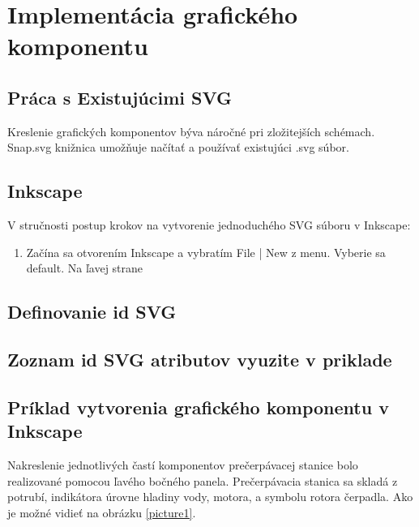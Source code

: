 \chapter{Implementácia grafického komponentu}

\section {Práca s Existujúcimi SVG}
Kreslenie grafických komponentov býva náročné pri zložitejších schémach. Snap.svg knižnica umožňuje načítať a používať existujúci .svg súbor.  


\section{Inkscape}

V stručnosti postup krokov na vytvorenie jednoduchého SVG súboru v Inkscape: 
\begin{enumerate}
	\item Začína sa otvorením Inkscape a vybratím File | New z menu. Vyberie sa default. 
	Na ľavej strane
\end{enumerate}

\section{Definovanie id SVG}
\section{Zoznam id SVG atributov vyuzite v priklade}





\section{Príklad vytvorenia grafického komponentu v Inkscape}

Nakreslenie jednotlivých častí komponentov prečerpávacej stanice bolo realizované pomocou ľavého bočného panela. Prečerpávacia stanica sa skladá z potrubí, indikátora úrovne hladiny vody, motora, a symbolu rotora čerpadla. Ako je možné vidieť na obrázku  \ref{picture1}.  


